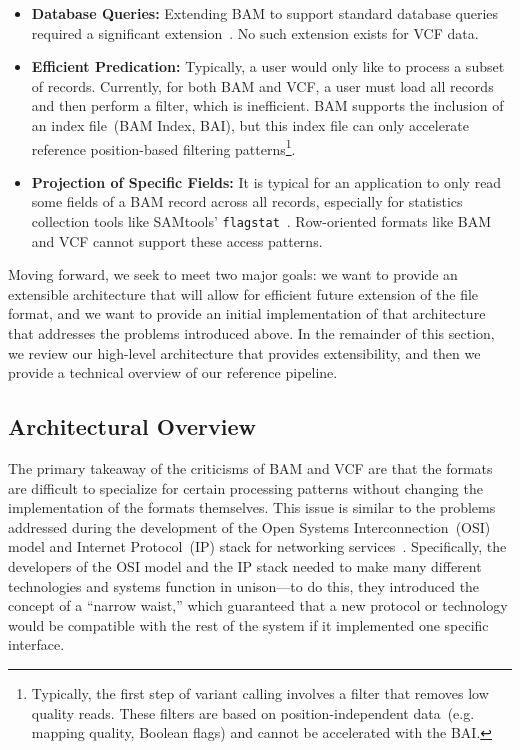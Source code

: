 \documentclass{bioinfo}
\begin{document}
\begin{itemize}
\item \textbf{Database Queries:} Extending BAM to support standard database queries required a significant extension~\citep{kozanitis13}.
No such extension exists for VCF data.
\item \textbf{Efficient Predication:} Typically, a user would only like to process a subset of records. Currently, for both BAM and VCF, a user must load all
records and then perform a filter, which is inefficient. BAM supports the inclusion of an index file~(BAM Index, BAI), but this index file can only accelerate
reference position-based filtering patterns\footnote{Typically, the first step of variant calling involves a filter that removes low quality reads. These filters
are based on position-independent data~(e.g. mapping quality, Boolean flags) and cannot be accelerated with the BAI.}.
\item \textbf{Projection of Specific Fields:} It is typical for an application to only read some fields of a BAM record across all records, especially for
statistics collection tools like SAMtools' \texttt{flagstat}~\citep{li09}. Row-oriented formats like BAM and VCF cannot support these access patterns.
\end{itemize}

Moving forward, we seek to meet two major goals: we want to provide an extensible architecture that will allow for efficient future extension of the
file format, and we want to provide an initial implementation of that architecture that addresses the problems introduced above. In the remainder
of this section, we review our high-level architecture that provides extensibility, and then we provide a technical overview of our reference pipeline.

\subsection{Architectural Overview}
\label{sec:architectural-overview}

The primary takeaway of the criticisms of BAM and VCF are that the formats are difficult to specialize for certain processing patterns without
changing the implementation of the formats themselves. This issue is similar to the problems addressed during the development of the Open
Systems Interconnection~(OSI) model and Internet Protocol~(IP) stack for networking services~\citep{zimmermann80}. Specifically, the developers
of the OSI model and the IP stack needed to make many different technologies and systems function in unison---to do this, they introduced the
concept of a ``narrow waist,'' which guaranteed that a new protocol or technology would be compatible with the rest of the system if it implemented
one specific interface.
\end{document}
